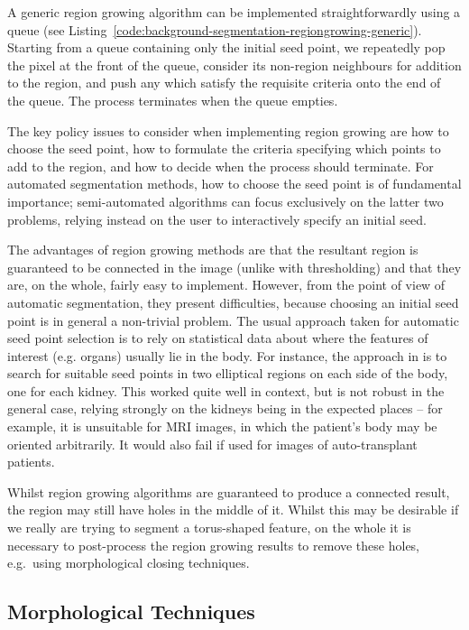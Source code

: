A generic region growing algorithm can be implemented straightforwardly using a queue (see Listing~\ref{code:background-segmentation-regiongrowing-generic}). Starting from a queue containing only the initial seed point, we repeatedly pop the pixel at the front of the queue, consider its non-region neighbours for addition to the region, and push any which satisfy the requisite criteria onto the end of the queue. The process terminates when the queue empties.

The key policy issues to consider when implementing region growing are how to choose the seed point, how to formulate the criteria specifying which points to add to the region, and how to decide when the process should terminate. For automated segmentation methods, how to choose the seed point is of fundamental importance; semi-automated algorithms can focus exclusively on the latter two problems, relying instead on the user to interactively specify an initial seed.

The advantages of region growing methods are that the resultant region is guaranteed to be connected in the image (unlike with thresholding) and that they are, on the whole, fairly easy to implement. However, from the point of view of automatic segmentation, they present difficulties, because choosing an initial seed point is in general a non-trivial problem. The usual approach taken for automatic seed point selection is to rely on statistical data about where the features of interest (e.g. organs) usually lie in the body. For instance, the approach in \cite{lin06} is to search for suitable seed points in two elliptical regions on each side of the body, one for each kidney. This worked quite well in context, but is not robust in the general case, relying strongly on the kidneys being in the expected places -- for example, it is unsuitable for MRI images, in which the patient's body may be oriented arbitrarily. It would also fail if used for images of auto-transplant patients.

Whilst region growing algorithms are guaranteed to produce a connected result, the region may still have holes in the middle of it. Whilst this may be desirable if we really are trying to segment a torus-shaped feature, on the whole it is necessary to post-process the region growing results to remove these holes, e.g.~using morphological closing techniques.

\subsection{Morphological Techniques}

